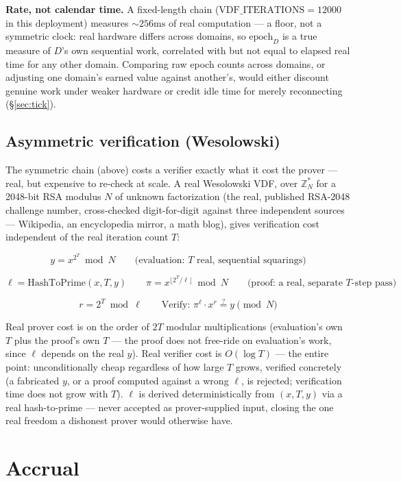 \documentclass[10pt]{article}
\begin{document}
\textbf{Rate, not calendar time.} A fixed-length chain ($\mathrm{VDF\_ITERATIONS} = 12000$ in this deployment) measures $\sim256\mathrm{ms}$ of real computation --- a floor, not a symmetric clock: real hardware differs across domains, so $\mathrm{epoch}_D$ is a true measure of $D$'s own sequential work, correlated with but not equal to elapsed real time for any other domain. Comparing raw epoch counts across domains, or adjusting one domain's earned value against another's, would either discount genuine work under weaker hardware or credit idle time for merely reconnecting (\S\ref{sec:tick}).

\subsection{Asymmetric verification (Wesolowski)}

The symmetric chain (above) costs a verifier exactly what it cost the prover --- real, but expensive to re-check at scale. A real Wesolowski VDF, over $\mathbb{Z}_N^*$ for a 2048-bit RSA modulus $N$ of unknown factorization (the real, published RSA-2048 challenge number, cross-checked digit-for-digit against three independent sources --- Wikipedia, an encyclopedia mirror, a math blog), gives verification cost independent of the real iteration count $T$:

\[
y = x^{2^T} \bmod N \qquad \text{(evaluation: $T$ real, sequential squarings)}
\]

\[
\ell = \mathrm{HashToPrime}(x, T, y) \qquad \pi = x^{\lfloor 2^T/\ell \rfloor} \bmod N \qquad \text{(proof: a real, separate $T$-step pass)}
\]

\[
r = 2^T \bmod \ell \qquad \text{Verify: } \pi^{\ell} \cdot x^{r} \stackrel{?}{=} y \pmod N
\]

Real prover cost is on the order of $2T$ modular multiplications (evaluation's own $T$ plus the proof's own $T$ --- the proof does not free-ride on evaluation's work, since $\ell$ depends on the real $y$). Real verifier cost is $O(\log T)$ --- the entire point: unconditionally cheap regardless of how large $T$ grows, verified concretely (a fabricated $y$, or a proof computed against a wrong $\ell$, is rejected; verification time does not grow with $T$). $\ell$ is derived deterministically from $(x, T, y)$ via a real hash-to-prime --- never accepted as prover-supplied input, closing the one real freedom a dishonest prover would otherwise have.

\section{Accrual}
\label{sec:accrual}
\end{document}
